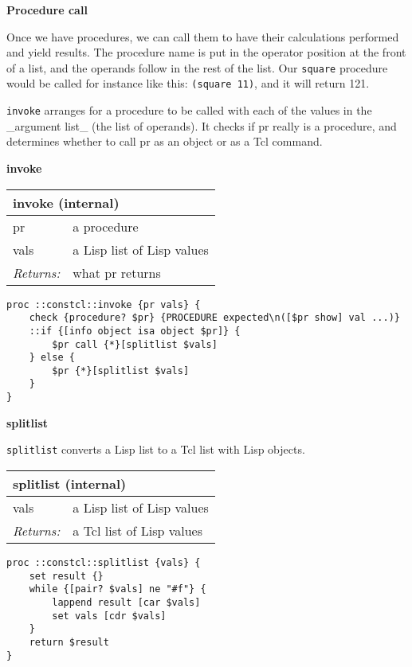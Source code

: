 \documentclass{report}
\begin{document}
\textbf{Procedure call}


Once we have procedures, we can call them to have their calculations performed and yield results. The procedure name is put in the operator position at the front of a list, and the operands follow in the rest of the list. Our \texttt{square} procedure would be called for instance like this: \texttt{(square 11)}, and it will return 121.


\texttt{invoke} arranges for a procedure to be called with each of the values in the \_argument list\_ (the list of operands). It checks if pr really is a procedure, and determines whether to call pr as an object or as a Tcl command.


\textbf{invoke}

\begin{tabular}{ |l l| }
\hline
\multicolumn{2}{|l|}{invoke (internal)} \\
\hline
pr & a procedure \\
vals & a Lisp list of Lisp values \\
\textit{Returns:} & what pr returns \\
\hline
\end{tabular}

\noindent\makebox[\linewidth]{\rule{\linewidth}{0.4pt}}
\begin{lstlisting}
proc ::constcl::invoke {pr vals} {
    check {procedure? $pr} {PROCEDURE expected\n([$pr show] val ...)}
    ::if {[info object isa object $pr]} {
        $pr call {*}[splitlist $vals]
    } else {
        $pr {*}[splitlist $vals]
    }
}
\end{lstlisting}
\noindent\makebox[\linewidth]{\rule{\linewidth}{0.4pt}}

\textbf{splitlist}


\texttt{splitlist} converts a Lisp list to a Tcl list with Lisp objects.

\begin{tabular}{ |l l| }
\hline
\multicolumn{2}{|l|}{splitlist (internal)} \\
\hline
vals & a Lisp list of Lisp values \\
\textit{Returns:} & a Tcl list of Lisp values \\
\hline
\end{tabular}

\noindent\makebox[\linewidth]{\rule{\linewidth}{0.4pt}}
\begin{lstlisting}
proc ::constcl::splitlist {vals} {
    set result {}
    while {[pair? $vals] ne "#f"} {
        lappend result [car $vals]
        set vals [cdr $vals]
    }
    return $result
}
\end{lstlisting}
\noindent\makebox[\linewidth]{\rule{\linewidth}{0.4pt}}
\end{document}
